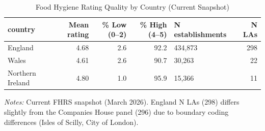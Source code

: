 \begin{table}[!h]
\centering
\caption{\label{tab:quality}Food Hygiene Rating Quality by Country (Current Snapshot)}
\centering
\small
\begin{tabular}[t]{lrrrlr}
\toprule
country & Mean rating & \% Low (0--2) & \% High (4--5) & N establishments & N LAs\\
\midrule
England & 4.68 & 2.6 & 92.2 & 434,873 & 298\\
Wales & 4.61 & 2.6 & 90.7 & 30,263 & 22\\
Northern Ireland & 4.80 & 1.0 & 95.9 & 15,366 & 11\\
\bottomrule
\end{tabular}

\par \raggedright
\textit{Notes:} Current FHRS snapshot (March 2026). England N LAs (298) differs slightly from the Companies House panel (296) due to boundary coding differences (Isles of Scilly, City of London).
\end{table}
